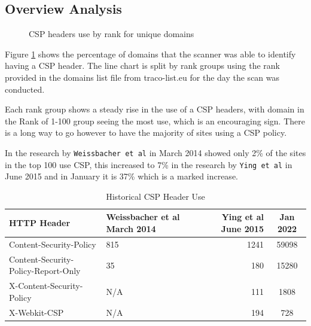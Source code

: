 \documentclass{mscreport}
\begin{document}
\subsection{Overview Analysis}

\begin{figure}[H]
	\begin{center}
		\caption{CSP headers use by rank for unique domains}
		\label{fig:csp_by_rank}
	\end{center}
\end{figure}


\noindent
Figure \ref{fig:csp_by_rank} shows the percentage of domains that the scanner was able to identify having a CSP header. The line chart is split by rank groups using the rank provided in the domains list file from traco-list.eu for the day the scan was conducted.

\vspace{0.3cm} \noindent
Each rank group shows a steady rise in the use of a CSP headers, with domain in the Rank of 1-100 group seeing the most use, which is an encouraging sign. There is a long way to go however to have the majority of sites using a CSP policy.

\vspace{0.3cm} \noindent
In the research by \texttt{Weissbacher et al} \cite{Weissbacher2014-vm} in March 2014 showed only 2\% of the sites in the top 100 use CSP, this increased to 7\% in the research by \texttt{Ying et al} \cite{Ying2016-ag} in June 2015 and in January it is 37\% which is a marked increase.

\begin{table}[t]
\footnotesize
  \begin{center}
    \begin{tabular}{|l|I|D|c|}  %
      \hline
      \textbf{HTTP Header} & \textbf{Weissbacher et al} \cite{Weissbacher2014-vm} March 2014 & \textbf{Ying et al} \cite{Ying2016-ag} June 2015 & Jan 2022 \\
      \hline
      Content-Security-Policy & 815 & 1241 & 59098\\
      \hline
      Content-Security-Policy-Report-Only & 35 & 180 & 15280\\
      \hline
      X-Content-Security-Policy & N/A & 111 & 1808\\
      \hline
      X-Webkit-CSP & N/A & 194 & 728\\
      \hline
    \end{tabular}
    \caption{Historical CSP Header Use}
    \label{table:csp_header_count} %
  \end{center}
\end{table}
\end{document}
